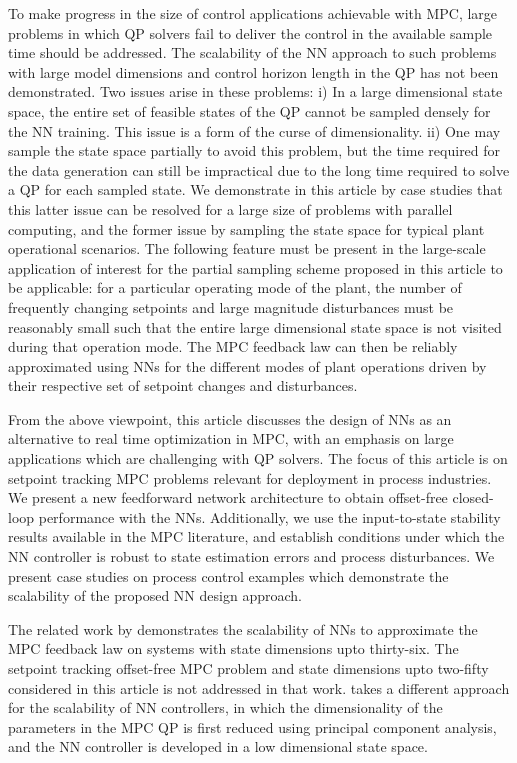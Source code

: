 \documentclass[preprint,5p, twocolumn, authoryear]{elsarticle}
\begin{document}
To make progress in the size of control applications 
achievable with MPC, large problems
in which QP solvers fail to deliver the 
control in the available sample time should be addressed.
The scalability of the NN approach
to such problems with large model dimensions and 
control horizon length in the QP
has not been demonstrated. Two issues arise 
in these problems:
i) In a large dimensional state space,   
the entire set of feasible states of the QP cannot be sampled  
densely for the NN training. This issue is 
a form of the curse of dimensionality.
ii) One may sample the state space partially
to avoid this problem, but the time required for the 
data generation can still be impractical
due to the long time required to solve a QP 
for each sampled state. 
We demonstrate in this article by case studies that
this latter issue can be resolved for a large size 
of problems with parallel 
computing, and the former issue by sampling the 
state space for typical plant operational scenarios.
The following feature must be present in the large-scale
application of interest for the partial sampling scheme 
proposed in this article to be applicable:
for a particular operating mode of the plant, 
the number of frequently changing setpoints
and large magnitude disturbances 
must be reasonably small 
such that the entire large
dimensional state space is not visited during that
operation mode. 
The MPC feedback law 
can then be reliably approximated using NNs
for the different modes of plant operations driven by  
their respective set
of setpoint changes and disturbances.

From the above viewpoint, 
this article discusses the design of NNs
as an alternative to real time optimization in MPC, 
with an emphasis on large applications which 
are challenging with QP solvers. 
The focus of this article is on setpoint tracking 
MPC problems relevant for deployment in process industries.
We present a new feedforward network architecture to obtain
offset-free closed-loop performance with the NNs.
Additionally, we use the input-to-state
stability results \citep*{sontag:wang:1995}
available in the MPC literature, and establish
conditions under which the NN controller 
is robust to state estimation errors and process 
disturbances. We present case studies 
on process control examples which
demonstrate the scalability of the proposed NN design 
approach.

The related work by \cite*{chen:wang:atanasov:kumar:morari:2019}
demonstrates the scalability of NNs 
to approximate the MPC feedback law on systems with 
state dimensions upto thirty-six. The setpoint 
tracking offset-free MPC problem and state 
dimensions upto two-fifty considered in this 
article is not addressed in that work. 
\cite*{drgona:picard:kvasnica:helsen:2018}
takes a different approach for the scalability
of NN controllers, in which 
the dimensionality of the parameters in the MPC QP is first 
reduced using principal component analysis, and the 
NN controller is developed in a low dimensional state space.
\end{document}
